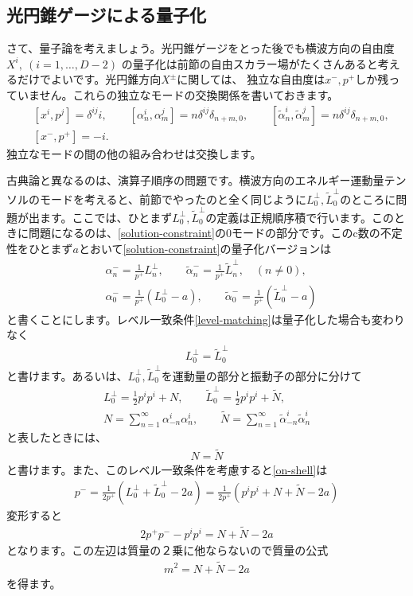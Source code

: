 \documentclass[report,paper=a4, fontsize=12pt, line_length=16cm, number_of_lines=33,dvipdfmx]{jlreq}
\numberwithin{equation}{chapter}
\numberwithin{equation}{section}
\newcommand{\alphat}{\tilde{\alpha}}
\newcommand{\Nt}{\widetilde{N}}
\newcommand{\Lp}{L^{\perp}}
\newcommand{\Ltp}{\widetilde{L}^{\perp}}
\begin{document}
\subsection{光円錐ゲージによる量子化}
さて、量子論を考えましょう。光円錐ゲージをとった後でも横波方向の自由度$X^{i},\ (i=1,\dots, D-2)$
の量子化は前節の自由スカラー場がたくさんあると考えるだけでよいです。光円錐方向$X^{\pm}$に関しては、
独立な自由度は$x^{-},p^{+}$しか残っていません。これらの独立なモードの交換関係を書いておきます。
\begin{align}
&[x^{i},p^{j}]=\delta^{ij}i,\qquad
[\alpha_n^{i},\alpha_m^{j}]=n\delta^{ij}\delta_{n+m,0},\qquad
[\alphat_n^{i},\alphat_m^{j}]=n\delta^{ij}\delta_{n+m,0},\\
&[x^{-},p^{+}]=-i.
\end{align}
独立なモードの間の他の組み合わせは交換します。

古典論と異なるのは、演算子順序の問題です。横波方向のエネルギー運動量テンソルのモードを考えると、前節でやったのと全く同じように$\Lp_0,\Ltp_0$のところに問題が出ます。ここでは、ひとまず$\Lp_0,\Ltp_0$の定義は正規順序積で行います。このときに問題になるのは、\eqref{solution-constraint}の0モードの部分です。このc数の不定性をひとまず$a$とおいて\eqref{solution-constraint}の量子化バージョンは
\begin{align}
&
\alpha_n^{-}=\frac{1}{p^{+}}\Lp_n,\qquad
\alphat_n^{-}=\frac{1}{p^{+}}\Ltp_n,\quad (n\ne 0),\\
&
\alpha_0^{-}=\frac{1}{p^{+}}(\Lp_0-a),\qquad
\alphat_0^{-}=\frac{1}{p^{+}}(\Ltp_0-a)\label{on-shell}
\end{align}
と書くことにします。レベル一致条件\eqref{level-matching}は量子化した場合も変わりなく
\begin{align}
\Lp_0=\Ltp_0
\end{align}
と書けます。あるいは、$\Lp_0,\Ltp_0$を運動量の部分と振動子の部分に分けて
\begin{align}
\Lp_0=\frac12 p^ip^i+N,\qquad
\Ltp_0=\frac12 p^ip^i+\Nt,\\
N=\sum_{n=1}^\infty\alpha^{i}_{-n}\alpha^{i}_{n},\qquad
\Nt=\sum_{n=1}^\infty\alphat^{i}_{-n}\alphat^{i}_{n}
\end{align}
と表したときには、
\begin{align}
N=\Nt
\label{level-matching2}
\end{align}
と書けます。また、このレベル一致条件を考慮すると\eqref{on-shell}は
\begin{align}
p^{-}=\frac{1}{2p^{+}}(\Lp_0+\Ltp_0-2a)
=\frac{1}{2p^{+}}(p^ip^i+N+\Nt-2a)
\end{align}
変形すると
\begin{align}
2p^{+}p^{-}-p^i p^i=N+\Nt-2a
\end{align}
となります。この左辺は質量の２乗に他ならないので質量の公式
\begin{align}
m^2=N+\Nt-2a
\label{mass-formula}
\end{align}
を得ます。
\end{document}
